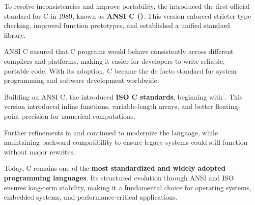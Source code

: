 \begin{NxSSSSBox}
	\begin{NxIDBox}
		To resolve inconsistencies and improve portability, the  introduced the first official standard for C in 1989, known as \textbf{ANSI C ()}. This version enforced stricter type checking, improved function prototypes, and established a unified standard library.
	\end{NxIDBox}
	\begin{NxIDBox}
		ANSI C ensured that C programs would behave consistently across different compilers and platforms, making it easier for developers to write reliable, portable code. With its adoption, C became the de facto standard for system programming and software development worldwide.
	\end{NxIDBox}
	\begin{NxIDBox}
		Building on ANSI C, the  introduced \textbf{ISO C standards}, beginning with . This version introduced inline functions, variable-length arrays, and better floating-point precision for numerical computations.
	\end{NxIDBox}
	\begin{NxIDBox}
	Further refinements in  and  continued to modernize the language, while maintaining backward compatibility to ensure legacy systems could still function without major rewrites.
	\end{NxIDBox}
	\begin{NxIDBox}
		Today, C remains one of the \textbf{most standardized and widely adopted programming languages}. Its structured evolution through ANSI and ISO ensures long-term stability, making it a fundamental choice for operating systems, embedded systems, and performance-critical applications.
	\end{NxIDBox}
\end{NxSSSSBox}

